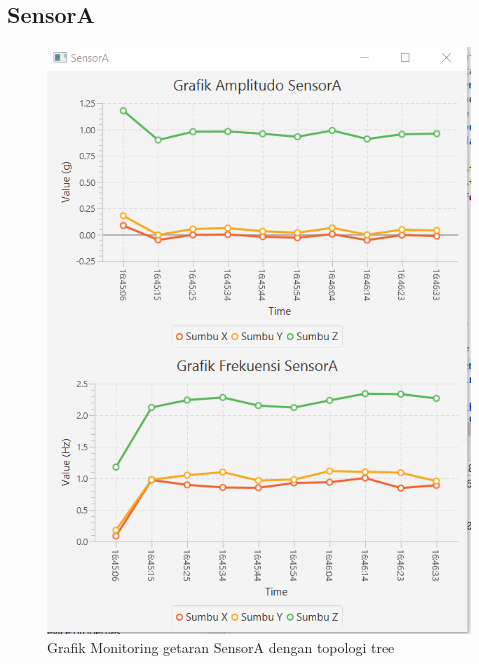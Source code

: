 \subsection{SensorA}
\begin{figure}[H] 
	\centering  
	\includegraphics[scale=1]{Lampiran/HasilPengujian/sensorA_tree.PNG} 
	\caption[Grafik Monitoring getaran SensorA dengan topologi tree]{Grafik Monitoring getaran SensorA dengan topologi tree}
	\label{fig:grafik_A_tree_paskal} 
\end{figure}

